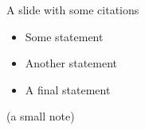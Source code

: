 \begin{frame}{A slide with some citations}

	\begin{itemize}
		\item Some statement {\cite{Brodo2022NNAnalysis}}
		\item Another statement {\cite{Brodo2022NNAnalysis}}
		\item A final statement {\cite{Brodo2022NNAnalysis}}
	\end{itemize}

	\vspace{3ex}
	\begin{center}
		\scriptsize (a small note)
	\end{center}

\end{frame}

